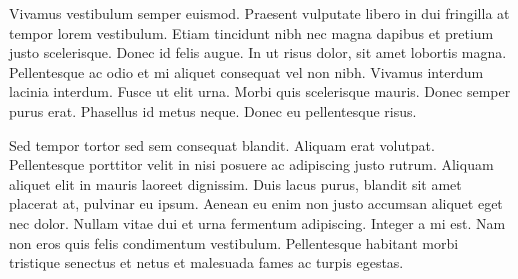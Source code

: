Vivamus vestibulum semper euismod. Praesent vulputate libero in dui fringilla at
tempor lorem vestibulum. Etiam tincidunt nibh nec magna dapibus et pretium justo
scelerisque. Donec id felis augue. In ut risus dolor, sit amet lobortis magna.
Pellentesque ac odio et mi aliquet consequat vel non nibh. Vivamus interdum
lacinia interdum. Fusce ut elit urna. Morbi quis scelerisque mauris. Donec
semper purus erat. Phasellus id metus neque. Donec eu pellentesque risus.

Sed tempor tortor sed sem consequat blandit. Aliquam erat volutpat. Pellentesque
porttitor velit in nisi posuere ac adipiscing justo rutrum. Aliquam aliquet elit
in mauris laoreet dignissim. Duis lacus purus, blandit sit amet placerat at,
pulvinar eu ipsum. Aenean eu enim non justo accumsan aliquet eget nec dolor.
Nullam vitae dui et urna fermentum adipiscing. Integer a mi est. Nam non eros
quis felis condimentum vestibulum. Pellentesque habitant morbi tristique
senectus et netus et malesuada fames ac turpis egestas.


